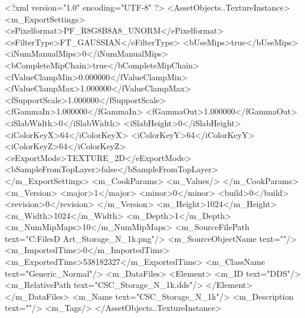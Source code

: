 <?xml version="1.0" encoding="UTF-8" ?>
<AssetObjects..TextureInstance>
	<m_ExportSettings>
		<ePixelformat>PF_R8G8B8A8_UNORM</ePixelformat>
		<eFilterType>FT_GAUSSIAN</eFilterType>
		<bUseMips>true</bUseMips>
		<iNumManualMips>0</iNumManualMips>
		<bCompleteMipChain>true</bCompleteMipChain>
		<fValueClampMin>0.000000</fValueClampMin>
		<fValueClampMax>1.000000</fValueClampMax>
		<fSupportScale>1.000000</fSupportScale>
		<fGammaIn>1.000000</fGammaIn>
		<fGammaOut>1.000000</fGammaOut>
		<iSlabWidth>0</iSlabWidth>
		<iSlabHeight>0</iSlabHeight>
		<iColorKeyX>64</iColorKeyX>
		<iColorKeyY>64</iColorKeyY>
		<iColorKeyZ>64</iColorKeyZ>
		<eExportMode>TEXTURE_2D</eExportMode>
		<bSampleFromTopLayer>false</bSampleFromTopLayer>
	</m_ExportSettings>
	<m_CookParams>
		<m_Values/>
	</m_CookParams>
	<m_Version>
		<major>1</major>
		<minor>0</minor>
		<build>0</build>
		<revision>0</revision>
	</m_Version>
	<m_Height>1024</m_Height>
	<m_Width>1024</m_Width>
	<m_Depth>1</m_Depth>
	<m_NumMipMaps>10</m_NumMipMaps>
	<m_SourceFilePath text="C:\Users\Shadow\Desktop\Working Files\3D Art\Textures\CSC_Storage_N_1k.png"/>
	<m_SourceObjectName text=""/>
	<m_ImportedTime>0</m_ImportedTime>
	<m_ExportedTime>538182327</m_ExportedTime>
	<m_ClassName text="Generic_Normal"/>
	<m_DataFiles>
		<Element>
			<m_ID text="DDS"/>
			<m_RelativePath text="CSC_Storage_N_1k.dds"/>
		</Element>
	</m_DataFiles>
	<m_Name text="CSC_Storage_N_1k"/>
	<m_Description text=""/>
	<m_Tags/>
</AssetObjects..TextureInstance>

